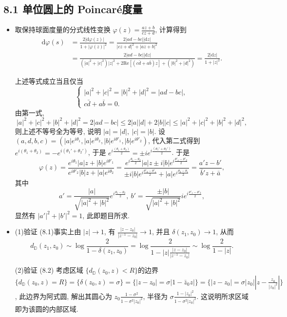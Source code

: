 \subsection*{8.1 单位圆上的 Poincar\'{e}度量}
\begin{itemize}
    
    \item[8.1.1] 取保持球面度量的分式线性变换 $\varphi(z) = \frac{az+b}{cz+d}$, 
    计算得到
    \begin{align*}
        \mathrm{d}\varphi(s)& = \frac{2|\mathrm{d}\varphi(z)|}{1+|\varphi(z)|^2} 
        = \frac{2|ad-bc||\mathrm{d}z|}{|cz+d|^2+|az+b|^2}\\
        & = \frac{2|ad-bc||\mathrm{d}z|}{(|a|^2+|c|^2)|z|^2 
        + 2\text{Re}[(c\bar{d}+ a\bar{b})z]+ (|b|^2+|d|^2)} 
        = \frac{2|\mathrm{d}z|}{1+|z|^2}.
    \end{align*} 

    上述等式成立当且仅当
    $$\begin{cases} |a|^2+|c|^2 = |b|^2+|d|^2= |ad-bc|,   \\
          c\bar{d}+ a\bar{b} = 0. \end{cases}$$
    由第一式, 
    $$|a|^2+|c|^2 +|b|^2+|d|^2 = 2|ad-bc|
    \le 2|a||d|+2|b||c|\le|a|^2+|c|^2 +|b|^2+|d|^2, $$
则上述不等号全为等号, 说明 $|a| =|d|,\ |c|=|b| $. 
设 $(a,d,b,c) = (|a|e^{i\theta_1},|a|e^{i\theta_2},|b|e^{i\theta'_1},|b|e^{i\theta'_2})$, 
代入第二式得到  $e^{i(\theta_1+\theta_2)} = -e^{i(\theta_1'+\theta_2')}$, 
于是  $e^{i \frac{(\theta_1+\theta_2)}{2}} 
=\pm i  e^{i \frac{(\theta_1'+\theta_2')}{2}}$. 于是
$$\varphi(z) 
= \frac{e^{i\theta_1}|a|z+ |b|e^{i\theta'_1}}
{e^{i\theta'_2}|b|z+ |a|e^{i\theta_2}} 
= \frac{e^{i\frac{\theta_1-\theta_2}{2}}|a|z
\pm   i |b|e^{i\frac{\theta'_1-\theta'_2}{2}}}
{\pm   i |b|e^{i\frac{\theta'_2-\theta'_1}{2}}
+ |a|e^{i\frac{\theta_2-\theta_1}{2}}} 
= \frac{a'z-b'}{\bar{b}' z+\bar{a}}, $$
其中
$$ a' =\frac{|a|}{\sqrt{|a|^2+|b|^2}}e^{i\frac{\theta_1-\theta_2}{2}},
\ b' = \frac{\pm |b|}{\sqrt{|a|^2+|b|^2}}  i e^{i\frac{\theta'_1-\theta'_2}{2}},$$
显然有 $|a'|^2+|b'|^2=1$,  此即题目所求.

\item[8.1.2] (1)验证 (8.1)事实上由 $|z|\to 1$,  
有 $\frac{|z-z_0|}{|z^{-1}-z_0|}\to 1$, 
并且 $\delta(z_1,z_0 )\to 1$,  从而
$$ d_{\mathbb{D}}(z_1,z_0)\sim \log \frac{2}{1-\delta(z_1,z_0)} 
= \log \frac{2}{1-|z|\frac{|z-z_0|}{|z^{-1}-z_0|}}\sim \log \frac{2}{1-|z|}.$$

(2)验证 (8.2) 考虑区域 $\{d_{\mathbb{D}}(z_0,z)<R \}$的边界 
$\{d_{\mathbb{D}}(z_0,z)=R \} = \{\delta(z_0,z) = \sigma\} 
= \{|z-z_0| = \sigma|1-\bar{z}_0 z| \}=\{|z-z_0| 
= \sigma|z_0||z-\frac{z_0}{|z_0|^2}| \}$, 此边界为阿式圆, 
解出其圆心为 $z_0 \frac{1-\sigma^2}{1-\sigma^2 |z_0|^2}$, 
半径为 $\sigma \frac{1-|z_0|^2}{1-\sigma^2 |z_0|^2}$. 
这说明所求区域即为该圆的内部区域.


\end{itemize}
